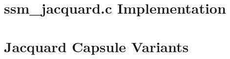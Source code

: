 
\section{ssm\_jacquard.c Implementation}
\label{vol2:sec:jacquard:impl}


\section{Jacquard Capsule Variants}
\label{vol2:sec:jacquard:capsules}

